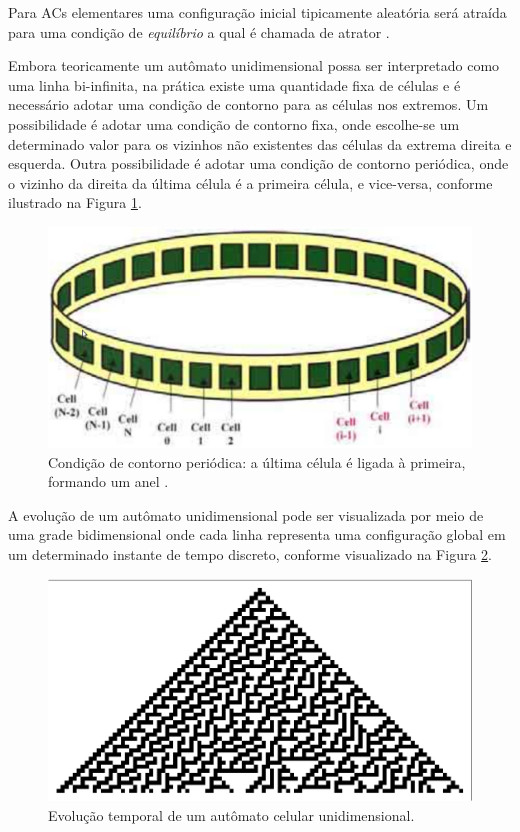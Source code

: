 \documentclass[12pt,a4paper]{article}
\begin{document}
Para ACs elementares uma configuração inicial tipicamente aleatória será atraída
para uma condição de \textit{equilíbrio} a qual é chamada de atrator .

Embora teoricamente um autômato unidimensional possa ser interpretado como uma linha bi-infinita,
na prática existe uma quantidade fixa de células e é necessário adotar uma condição de contorno
para as células nos extremos. Um possibilidade é adotar uma condição de contorno fixa, onde
escolhe-se um determinado valor para os vizinhos não existentes das células da extrema direita
e esquerda. Outra possibilidade é adotar uma condição de contorno periódica, onde o vizinho
da direita da última célula é a primeira célula, e vice-versa, conforme ilustrado na Figura
\ref{fig:ring}.

\begin{figure}[htp]
\begin{center}
\includegraphics[scale=0.3]{img/ring.eps}
\caption{Condição de contorno periódica: a última célula é ligada à primeira,
formando um anel .}
\label{fig:ring}
\end{center}
\end{figure}

A evolução de um autômato unidimensional pode ser visualizada por meio de uma grade bidimensional
onde cada linha representa uma configuração global em um determinado instante de tempo discreto,
conforme visualizado na Figura \ref{fig:celautomaton}.

\begin{figure}[htp]
\begin{center}
\includegraphics[scale=0.8]{img/CellularAutomaton.eps}
\caption{Evolução temporal de um autômato celular unidimensional.}
\label{fig:celautomaton}
\end{center}
\end{figure}
\end{document}
